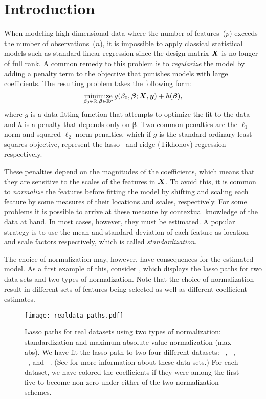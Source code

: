 \section{Introduction}

When modeling high-dimensional data where the number of features~(\(p\)) exceeds the number
of observations~(\(n\)), it is impossible to apply classical statistical models such as
standard linear regression since the design matrix \(\bm X\) is no longer of full rank. A
common remedy to this problem is to \emph{regularize} the model by adding a penalty term to
the objective that punishes models with large coefficients. The resulting problem takes the
following form:
\begin{equation}
  \label{eq:general-objective}
  \operatorname*{minimize}_{\beta_0 \in \mathbb{R},\bm{\beta} \in \mathbb{R}^p} g(\beta_0, \bm\beta; \bm X, \bm y) + h(\bm\beta),
\end{equation}
%
where \(g\) is a data-fitting function that attempts to optimize the fit to the data and
\(h\) is a penalty that depends only on \(\bm{\beta}\). Two common penalties are the
\(\ell_1\) norm and squared \(\ell_2\) norm penalties, which if \(g\) is the standard
ordinary least-squares objective, represent the
lasso~\citep{tibshirani1996,santosa1986,donoho1994} and ridge (Tikhonov) regression
respectively.

These penalties depend on the magnitudes of the coefficients, which means that they are
sensitive to the scales of the features in \(\bm X\). To avoid this, it is common to
\emph{normalize} the features before fitting the model by shifting and scaling each feature
by some measures of their locations and scales, respectively. For some problems it is
possible to arrive at these measure by contextual knowledge of the data at hand. In most
cases, however, they must be estimated. A popular strategy is to use the mean and standard
deviation of each feature as location and scale factors respectively, which is called
\emph{standardization}.

The choice of normalization may, however, have consequences for the estimated model. As a
first example of this, consider , which displays the lasso paths
for two data sets and two types of normalization. Note that the choice of normalization
result in different sets of features being selected as well as different coefficient
estimates.

\begin{figure}[bpt]
  \centering
  \texttt{[image: realdata\_paths.pdf]}
  \caption{%
    Lasso paths for real datasets using two types of normalization:
    standardization and maximum absolute value normalization (max--abs). We have fit
    the lasso path to two four different datasets:
    ~\citep{harrison1978}, ~\citep{golub1999},
    ~\citep{king1995,hirst1994}, and ~\citep{platt1998}. (See 
    for more information about these data sets.) For each
    dataset, we have colored the coefficients if they were among the first five
    to become non-zero under either of the two normalization schemes.   }
  \label{fig:realdata-paths}
\end{figure}

